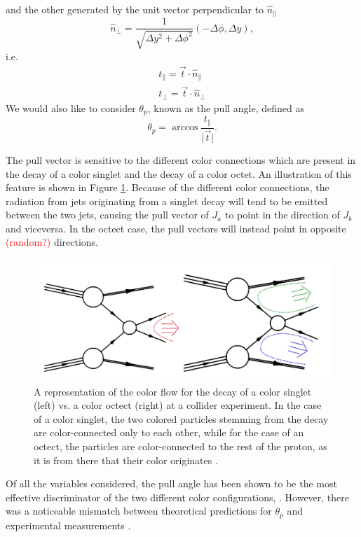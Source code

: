 \documentclass[10pt,a4paper]{book}
\newcommand\todo[1]{\textcolor{red}{#1}}
\begin{document}
and the other generated by the unit vector perpendicular to $\hat{n}_\parallel$
\begin{equation}
\hat{n}_\perp = \frac{1}{\sqrt{\Delta y^2 + \Delta \phi^2}}\left(-\Delta \phi, \Delta y \right),
\end{equation}
i.e.
\begin{gather}
t_\parallel = \vec{t}\cdot \hat{n}_\parallel \\
t_\perp = \vec{t}\cdot \hat{n}_\perp
\end{gather}
We would also like to consider $\theta_{p}$, known as the pull angle, defined as
\begin{equation}
\theta_p = \arccos \frac{t_\parallel}{\vert \vec{t} \vert}.
\end{equation} 

The pull vector is sensitive to the different color connections which are present in the decay of a color singlet and the decay of a color octet. An illustration of this feature is shown in Figure \ref{color connections}. Because of the different color connections, the radiation from jets originating from a singlet decay will tend to be emitted between the two jets, causing the pull vector of $J_a$ to point in the direction of $J_b$ and viceversa. In the octect case, the pull vectors will instead point in opposite \todo{(random?)} directions.
\begin{figure}[h]
\centering
\includegraphics[scale=0.2]{ch4_images/color_configurations}
\caption{A representation of the color flow for the decay of a color singlet (left) vs. a color octect (right) at a collider experiment. In the case of a color singlet, the two colored particles stemming from the decay are color-connected only to each other, while for the case of an octect, the particles are color-connected to the rest of the proton, as it is from there that their color originates \cite{Gallicchio:2010sw}.}
\label{color connections}
\end{figure}
Of all the variables considered, the pull angle has been shown to be the most effective discriminator of the two different color configurations, \cite{Gallicchio:2010sw}. However, there was a noticeable mismatch between theoretical predictions for $\theta_p$ and experimental measurements \cite{Larkoski:2019urm}. 
\end{document}
